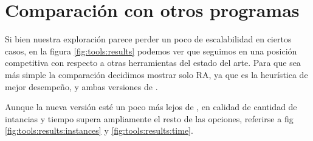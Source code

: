 \section{Comparación con otros programas}

Si bien nuestra exploración parece perder un poco de escalabilidad en ciertos casos, en la figura \ref{fig:tools:results} podemos ver que seguimos en una posición competitiva con respecto a otras herramientas del estado del arte. Para que sea más simple la comparación decidimos mostrar solo RA, ya que es la heurística de mejor desempeño, y ambas versiones de \DCS. 

Aunque la nueva versión esté un poco más lejos de \MYND, en calidad de cantidad de intancias y tiempo supera ampliamente el resto de las opciones, referirse a fig \ref{fig:tools:results:instances} y \ref{fig:tools:results:time}.
